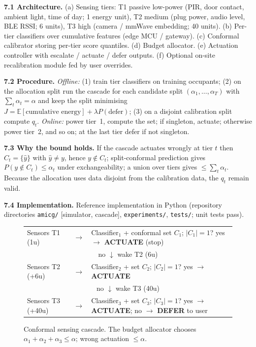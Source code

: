 \documentclass[10pt,a4paper]{article}
\newcommand{\sect}[1]{\par\vspace{5pt}{\bfseries\large #1}\par\vspace{1pt}}
\begin{document}
\sect{7. Description of the invention in detail}
\textbf{7.1 Architecture.} (a) Sensing tiers: T1 passive low-power (PIR, door contact, ambient light, time of day; 1 energy unit), T2 medium (plug power, audio level, BLE RSSI; 6 units), T3 high (camera / mmWave embedding; 40 units). (b) Per-tier classifiers over cumulative features (edge MCU / gateway). (c) Conformal calibrator storing per-tier score quantiles. (d) Budget allocator. (e) Actuation controller with escalate / actuate / defer outputs. (f) Optional on-site recalibration module fed by user overrides.

\textbf{7.2 Procedure.} \emph{Offline:} (1) train tier classifiers on training occupants; (2) on the allocation split run the cascade for each candidate split $(\alpha_1,\dots,\alpha_T)$ with $\sum_t\alpha_t=\alpha$ and keep the split minimising $J=\mathbb{E}[\text{cumulative energy}]+\lambda P(\text{defer})$; (3) on a disjoint calibration split compute $q_t$. \emph{Online:} power tier~1, compute the set; if singleton, actuate; otherwise power tier~2, and so on; at the last tier defer if not singleton.

\textbf{7.3 Why the bound holds.} If the cascade actuates wrongly at tier $t$ then $C_t=\{\hat y\}$ with $\hat y\neq y$, hence $y\notin C_t$; split-conformal prediction gives $P(y\notin C_t)\le\alpha_t$ under exchangeability; a union over tiers gives $\le\sum_t\alpha_t$. Because the allocation uses data disjoint from the calibration data, the $q_t$ remain valid.

\textbf{7.4 Implementation.} Reference implementation in Python (repository directories \texttt{amicg/} [simulator, cascade], \texttt{experiments/}, \texttt{tests/}; unit tests pass).

\begin{figure}[H]\centering\small
\begin{tabular}{@{}l c l@{}}
\toprule
Sensors T1 (1u) & $\rightarrow$ & Classifier$_1$ + conformal set $C_1$; $|C_1|=1$? yes $\to$ \textbf{ACTUATE} (stop)\\
\multicolumn{3}{c}{no $\downarrow$ wake T2 (6u)}\\
Sensors T2 (+6u) & $\rightarrow$ & Classifier$_2$ + set $C_2$; $|C_2|=1$? yes $\to$ \textbf{ACTUATE}\\
\multicolumn{3}{c}{no $\downarrow$ wake T3 (40u)}\\
Sensors T3 (+40u) & $\rightarrow$ & Classifier$_3$ + set $C_3$; $|C_3|=1$? yes $\to$ \textbf{ACTUATE}; no $\to$ \textbf{DEFER} to user\\
\bottomrule
\end{tabular}
\caption{Conformal sensing cascade. The budget allocator chooses $\alpha_1+\alpha_2+\alpha_3\le\alpha$; wrong actuation $\le\alpha$.}
\end{figure}
\end{document}
